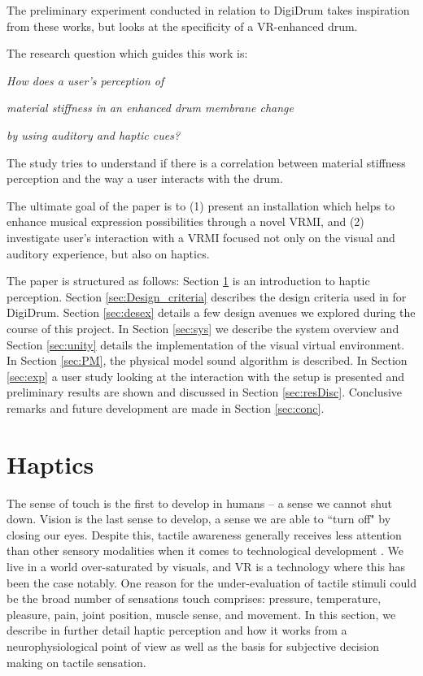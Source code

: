 \documentclass{article}
\begin{document}
The preliminary experiment conducted in relation to DigiDrum takes inspiration from these works, but looks at the specificity of a VR-enhanced drum.

The research question which guides this work is:
\vspace{0.2cm}

\centerline{\it How does a user's perception of}

\centerline{\it material stiffness in an enhanced drum membrane change}

\centerline{\it by using auditory and haptic cues?}
\vspace{0.2cm}
\noindent The study tries to understand if there is a correlation between material stiffness perception and the way a user interacts with the drum. 

The ultimate goal of the paper is to (1) present an installation which helps to enhance musical expression possibilities through a novel VRMI, and (2) investigate user's interaction with a VRMI focused not only on the visual and auditory experience, but also on haptics.


The paper is structured as follows: 
Section \ref{sec:haptics} is an introduction to haptic perception. Section \ref{sec:Design_criteria} describes the design criteria used in for DigiDrum. Section \ref{sec:desex} details a few design avenues we explored during the course of this project. In Section \ref{sec:sys} we describe the system overview and Section \ref{sec:unity} details the implementation of the visual virtual environment. In Section \ref{sec:PM}, the physical model sound algorithm is described. 
In Section \ref{sec:exp} a user study looking at the interaction with the setup is presented and preliminary results are shown and discussed in Section \ref{sec:resDisc}. Conclusive remarks and future development are made in Section \ref{sec:conc}.


\section{Haptics}\label{sec:haptics}
The sense of touch is the first to develop in humans -- a sense we cannot shut down. Vision is the last sense to develop, a sense we are able to ``turn off" \cite{Barnett1972} by closing our eyes. Despite this, tactile awareness generally receives less attention than other sensory modalities when it comes to technological development \cite{Gallace2012}. We live in a world over-saturated by visuals, and VR is a technology where this has been the case notably. One reason for the under-evaluation of tactile stimuli could be the broad number of sensations touch comprises: pressure, temperature, pleasure, pain, joint position, muscle sense, and movement. %
In this section, we describe in further detail haptic perception and how it works from a neurophysiological point of view as well as the basis for subjective decision making on tactile sensation.
\end{document}
